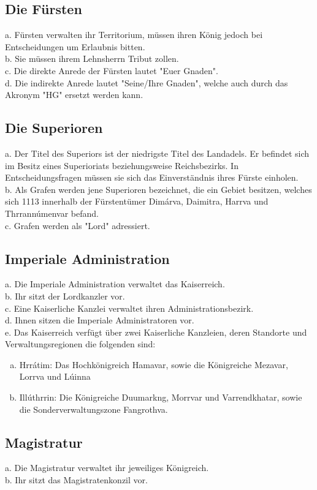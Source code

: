 \documentclass{article}
\begin{document}
\subsection{Die Fürsten}
a. Fürsten verwalten ihr Territorium, müssen ihren König jedoch bei Entscheidungen um Erlaubnis bitten.  \\
b. Sie müssen ihrem Lehnsherrn Tribut zollen.  \\
c. Die direkte Anrede der Fürsten lautet "Euer Gnaden". \\
d. Die indirekte Anrede lautet "Seine/Ihre Gnaden", welche auch durch das Akronym "HG" ersetzt werden kann.  

\subsection{Die Superioren}
a. Der Titel des Superiors ist der niedrigste Titel des Landadels. Er befindet sich im Besitz eines Superioriats beziehungsweise Reichsbezirks. In Entscheidungsfragen müssen sie sich das Einverständnis ihres Fürste einholen.  \\
b. Als Grafen werden jene Superioren bezeichnet, die ein Gebiet besitzen, welches sich 1113 innerhalb der Fürstentümer Dimárva, Daimitra, Harrva und Thrrannúmenvar befand.  \\
c. Grafen werden als "Lord" adressiert.  

\subsection{Imperiale Administration}
a. Die Imperiale Administration verwaltet das Kaiserreich.  \\
b. Ihr sitzt der Lordkanzler vor.  \\
c. Eine Kaiserliche Kanzlei verwaltet ihren Administrationsbezirk.  \\
d. Ihnen sitzen die Imperiale Administratoren vor.  \\
e. Das Kaiserreich verfügt über zwei Kaiserliche Kanzleien, deren Standorte und Verwaltungsregionen die folgenden sind:  
\begin{enumerate}[a)]
\item Hrrátim: Das Hochkönigreich Hamavar, sowie die Königreiche Mezavar, Lorrva und Lúinna  
\item Illúthrrin: Die Königreiche Duumarkng, Morrvar und Varrendkhatar, sowie die Sonderverwaltungszone Fangrothva.
\end{enumerate}

\subsection{Magistratur}
a. Die Magistratur verwaltet ihr jeweiliges Königreich.  \\
b. Ihr sitzt das Magistratenkonzil vor.
\end{document}
